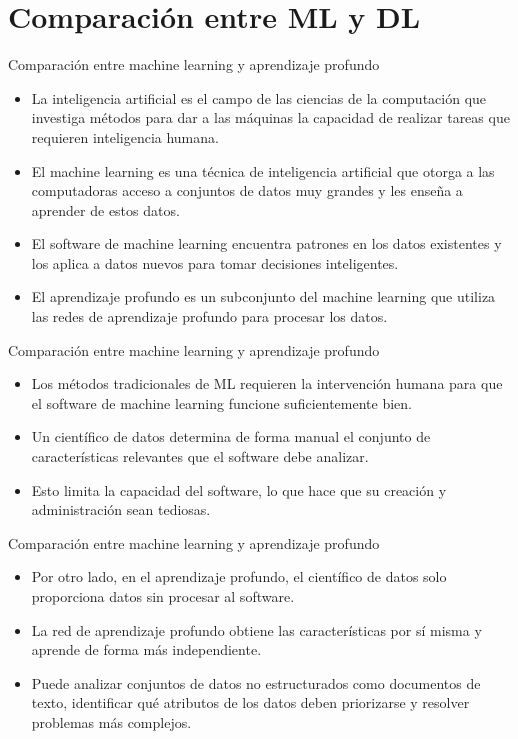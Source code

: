 \documentclass[11pt,aspectratio=169]{beamer}
\begin{document}
\section{Comparación entre ML y DL}
\begin{frame}{Comparación entre machine learning y aprendizaje profundo}
	\begin{itemize}
		\item La inteligencia artificial es el campo de las ciencias de la computación que investiga métodos para dar a las 
			máquinas la capacidad de realizar tareas que requieren inteligencia humana.\pause 
		\item El machine learning es una técnica de inteligencia artificial que otorga a las computadoras acceso a conjuntos 
			de datos muy grandes y les enseña a aprender de estos datos.\pause
		\item El software de machine learning encuentra patrones en los datos existentes y los aplica a datos nuevos para 
			tomar decisiones inteligentes. \pause 
		\item El aprendizaje profundo es un subconjunto del machine learning que utiliza las redes de aprendizaje profundo 
			para procesar los datos.
	\end{itemize}
\end{frame}

\begin{frame}{Comparación entre machine learning y aprendizaje profundo}
	\begin{itemize}
		\item Los métodos tradicionales de ML requieren la intervención humana para que el software de machine learning 
			funcione suficientemente bien.\pause 
		\item Un científico de datos determina de forma manual el conjunto de características relevantes que el software 
			debe analizar.\pause 
		\item Esto limita la capacidad del software, lo que hace que su creación y administración sean tediosas.
	\end{itemize}
\end{frame}

\begin{frame}{Comparación entre machine learning y aprendizaje profundo}
	\begin{itemize}
		\item Por otro lado, en el aprendizaje profundo, el científico de datos solo proporciona datos sin procesar al 
			software.\pause 
		\item La red de aprendizaje profundo obtiene las características por sí misma y aprende de forma más independiente.\pause
		\item Puede analizar conjuntos de datos no estructurados como documentos de texto, identificar qué atributos de los 
			datos deben priorizarse y resolver problemas más complejos.
	\end{itemize}
\end{frame}
\end{document}
